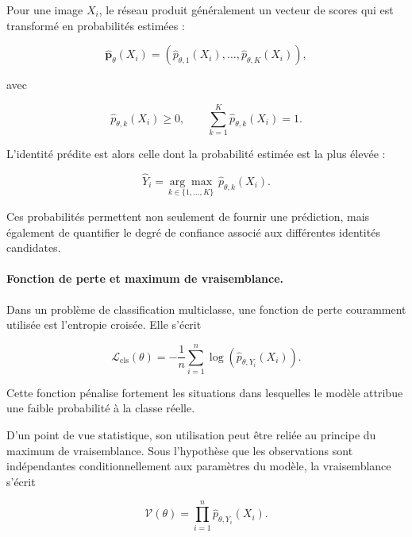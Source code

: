 \documentclass[11pt,a4paper]{report}
\begin{document}
Pour une image $X_i$, le réseau produit généralement un vecteur de scores qui
est transformé en probabilités estimées :

\begin{equation}
    \widehat{\boldsymbol{p}}_{\theta}(X_i)
    =
    \left(
        \widehat{p}_{\theta,1}(X_i),
        \ldots,
        \widehat{p}_{\theta,K}(X_i)
    \right),
\end{equation}

avec

\begin{equation}
    \widehat{p}_{\theta,k}(X_i) \geq 0,
    \qquad
    \sum_{k=1}^{K}
    \widehat{p}_{\theta,k}(X_i)=1.
\end{equation}

L'identité prédite est alors celle dont la probabilité estimée est la plus
élevée :

\begin{equation}
    \widehat{Y}_i
    =
    \underset{k \in \{1,\ldots,K\}}{\arg\max}
    \;
    \widehat{p}_{\theta,k}(X_i).
\end{equation}

Ces probabilités permettent non seulement de fournir une prédiction, mais
également de quantifier le degré de confiance associé aux différentes identités
candidates.

\paragraph{Fonction de perte et maximum de vraisemblance.}

Dans un problème de classification multiclasse, une fonction de perte
couramment utilisée est l'entropie croisée. Elle s'écrit

\begin{equation}
    \mathcal{L}_{\mathrm{cls}}(\theta)
    =
    -\frac{1}{n}
    \sum_{i=1}^{n}
    \log
    \left(
        \widehat{p}_{\theta,Y_i}(X_i)
    \right).
    \label{eq:cross_entropy}
\end{equation}

Cette fonction pénalise fortement les situations dans lesquelles le modèle
attribue une faible probabilité à la classe réelle.

D'un point de vue statistique, son utilisation peut être reliée au principe du
maximum de vraisemblance. Sous l'hypothèse que les observations sont
indépendantes conditionnellement aux paramètres du modèle, la vraisemblance
s'écrit

\begin{equation}
    \mathcal{V}(\theta)
    =
    \prod_{i=1}^{n}
    \widehat{p}_{\theta,Y_i}(X_i).
\end{equation}
\end{document}
